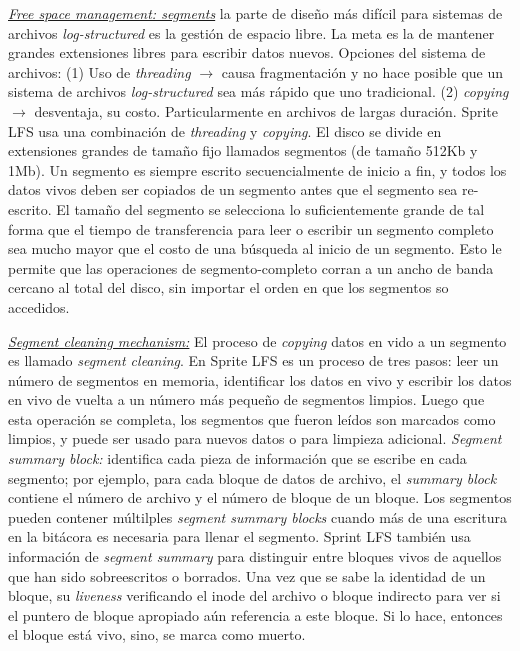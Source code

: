 \underline{\emph{Free space management: segments}} la parte de diseño más difícil para sistemas de archivos \emph{log-structured} es la gestión de espacio libre. La meta es la de mantener grandes extensiones libres para escribir datos nuevos. Opciones del sistema de archivos: (1) Uso de \emph{threading} $\to$ causa fragmentación y no hace posible que un sistema de archivos \emph{log-structured} sea más rápido que uno tradicional. (2) \emph{copying} $\to$ desventaja, su costo. Particularmente en archivos de largas duración. Sprite LFS usa una combinación de \emph{threading} y \emph{copying}. El disco se divide en extensiones grandes de tamaño fijo llamados segmentos (de tamaño 512Kb y 1Mb). Un segmento es siempre escrito secuencialmente de inicio a fin, y todos los datos vivos deben ser copiados de un segmento antes que el segmento sea re-escrito. El tamaño del segmento se selecciona lo suficientemente grande de tal forma que el tiempo de transferencia para leer o escribir un segmento completo sea mucho mayor que el costo de una búsqueda al inicio de un segmento. Esto le permite que las operaciones de segmento-completo corran a un ancho de banda cercano al total del disco, sin importar el orden en que los segmentos so accedidos. 

\underline{\emph{Segment cleaning mechanism:}} El proceso de \emph{copying} datos en vido a un segmento es llamado \emph{segment cleaning}. En Sprite LFS es un proceso de tres pasos: leer un número de segmentos en memoria, identificar los datos en vivo y escribir los datos en vivo de vuelta a un número más pequeño de segmentos limpios. Luego que esta operación se completa, los segmentos que fueron leídos son marcados como limpios, y puede ser usado para nuevos datos o para limpieza adicional. \emph{Segment summary block:} identifica cada pieza de información que se escribe en cada segmento; por ejemplo, para cada bloque de datos de archivo, el \emph{summary block} contiene el número de archivo y el número de bloque de un bloque. Los segmentos pueden contener múltilples \emph{segment summary blocks} cuando más de una escritura en la bitácora es necesaria para llenar el segmento. Sprint LFS también usa información de \emph{segment summary} para distinguir entre bloques vivos de aquellos que han sido sobreescritos o borrados. Una vez que se sabe la identidad de un bloque, su \emph{liveness} verificando el inode del archivo o bloque indirecto para ver si el puntero de bloque apropiado aún referencia a este bloque. Si lo hace, entonces el bloque está vivo, sino, se marca como muerto. 

